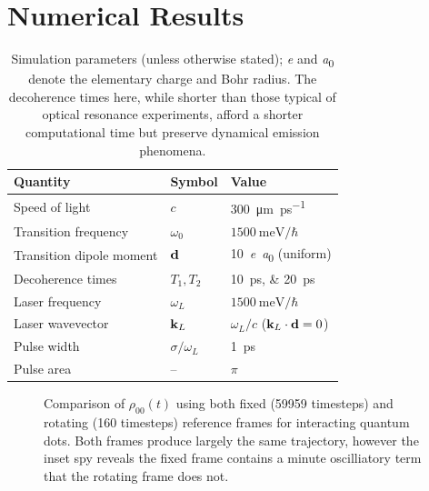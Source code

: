 \section{\label{section:results}Numerical Results}
\begin{table}
  \centering
  \begin{tabular}{lll}
    Quantity                 & Symbol            & Value                        \\ \hline
    Speed of light           & $c$               & \SI{300}{\micro\meter \per \pico\second} \\
    Transition frequency     & $\omega_0$        & $\SI{1500}{\milli\eV}/\hbar$ \\
    Transition dipole moment & $\vb{d}$          & \SI{10}{\elementarycharge\bohr} (uniform) \\
    Decoherence times        & $T_{1}, T_{2}$    & \SIlist{10;20}{\pico\second} \\
    Laser frequency          & $\omega_L$        & $\SI{1500}{\milli\eV}/\hbar$ \\
    Laser wavevector         & $\vb{k}_L$        & $\omega_L/c$ ($\vb{k}_L \cdot \vb{d} = 0$) \\
    Pulse width              & $\sigma/\omega_L$ & \SI{1}{\pico\second} \\
    Pulse area               &  --               & $\pi$ \\
  \end{tabular}
  \caption{\label{table:parameters}Simulation parameters (unless otherwise stated); \si{\elementarycharge} and \si{\bohr} denote the elementary charge and Bohr radius.
    The decoherence times here, while shorter than those typical of optical resonance experiments, afford a shorter computational time but preserve dynamical emission phenomena.
  }
\end{table}

\begin{figure}
  \centering
  
  \caption{
    Comparison of $\rho_{00}(t)$ using both fixed (59959 timesteps) and rotating (160 timesteps) reference frames for interacting quantum dots.
    Both frames produce largely the same trajectory, however the inset spy reveals the fixed frame contains a minute oscilliatory term that the rotating frame does not.
  }
\end{figure}

